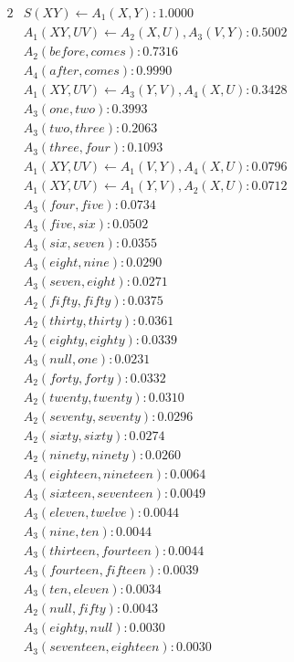 \documentclass[11pt, twocolumn]{article}
\begin{document}
\begin{alignat*}{2}
&S(X Y) \leftarrow A_1(X, Y) : 1.0000 \\
&A_1(X Y, U V) \leftarrow A_2(X, U), A_3(V, Y) : 0.5002 \\
&A_2(before, comes) : 0.7316 \\
&A_4(after, comes) : 0.9990 \\
&A_1(X Y, U V) \leftarrow A_3(Y, V), A_4(X, U) : 0.3428 \\
&A_3(one, two) : 0.3993 \\
&A_3(two, three) : 0.2063 \\
&A_3(three, four) : 0.1093 \\
&A_1(X Y, U V) \leftarrow A_1(V, Y), A_4(X, U) : 0.0796 \\
&A_1(X Y, U V) \leftarrow A_1(Y, V), A_2(X, U) : 0.0712 \\
&A_3(four, five) : 0.0734 \\
&A_3(five, six) : 0.0502 \\
&A_3(six, seven) : 0.0355 \\
&A_3(eight, nine) : 0.0290 \\
&A_3(seven, eight) : 0.0271 \\
&A_2(fifty, fifty) : 0.0375 \\
&A_2(thirty, thirty) : 0.0361 \\
&A_2(eighty, eighty) : 0.0339 \\
&A_3(null, one) : 0.0231 \\
&A_2(forty, forty) : 0.0332 \\
&A_2(twenty, twenty) : 0.0310 \\
&A_2(seventy, seventy) : 0.0296 \\
&A_2(sixty, sixty) : 0.0274 \\
&A_2(ninety, ninety) : 0.0260 \\
&A_3(eighteen, nineteen) : 0.0064 \\
&A_3(sixteen, seventeen) : 0.0049 \\
&A_3(eleven, twelve) : 0.0044 \\
&A_3(nine, ten) : 0.0044 \\
&A_3(thirteen, fourteen) : 0.0044 \\
&A_3(fourteen, fifteen) : 0.0039 \\
&A_3(ten, eleven) : 0.0034 \\
&A_2(null, fifty) : 0.0043 \\
&A_3(eighty, null) : 0.0030 \\
&A_3(seventeen, eighteen) : 0.0030 \\

\end{alignat*}
\end{document}
